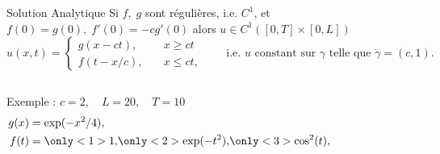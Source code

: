 \documentclass[aspectratio=169, french]{beamer}
\begin{document}
\begin{frame}{Solution Analytique}
	Si $f, \; g$ sont régulières, i.e. $C^{1}$, et $f(0) = g(0), \; f'(0) = -c g'(0)$
alors  $u \in C^1([0, T]\times[0, L])$ 
\begin{equation*}
	u(x, t) = \begin{cases}
	g(x - ct), \quad &x\ge ct\\
	f(t-x/c), \quad &x\le ct,
	\end{cases}
	\qquad\text{i.e. $u$ constant sur $\gamma$ telle que $\dot{\gamma} = (c ,1)$.}
\end{equation*}

\begin{columns}
	\begin{column}{.4\textwidth}
	Exemple : $c=2, \quad L=20, \quad T = 10$
	\begin{align*}
		g(x) &= \exp(-x^2/4), \\
		f(t) &= \only<1>{1,}  \only<2>{\exp(-t^2),}  \only<3>{\cos^2(t),}
 	\end{align*}
	\end{column}
	\begin{column}{.6\textwidth}
		\begin{figure}
			\centering

\end{figure}
\end{column}
\end{columns}
\end{frame}
\end{document}

